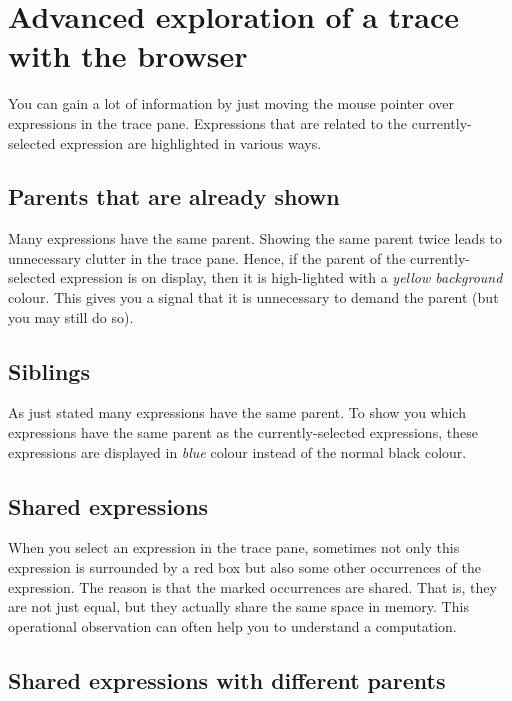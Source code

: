 \documentclass[12pt]{article}
\begin{document}

\section{Advanced exploration of a trace with the browser}\label{advanced}

You can gain a lot of information by just moving the mouse pointer over expressions in the trace pane. Expressions that are related to the currently-selected expression are highlighted in various ways.

\subsection{Parents that are already shown}

Many expressions have the same parent. Showing the same parent twice leads to unnecessary clutter in the trace pane. Hence, if the parent of the currently-selected expression is on display, then it is high-lighted with a \emph{yellow background} colour. This gives you a signal that it is unnecessary to demand the parent (but you may still do so).

\subsection{Siblings}

As just stated many expressions have the same parent. To show you which expressions have the same parent as the currently-selected expressions, these expressions are displayed in \emph{blue} colour instead of the normal black colour.

\subsection{Shared expressions}

When you select an expression in the trace pane, sometimes not only this expression is surrounded by a red box but also some other occurrences of the expression.
The reason is that the marked occurrences are shared. That is, they are not just equal, but they actually share the same space in memory.
This operational observation can often help you to understand a computation.

\subsection{Shared expressions with different parents}
\end{document}
